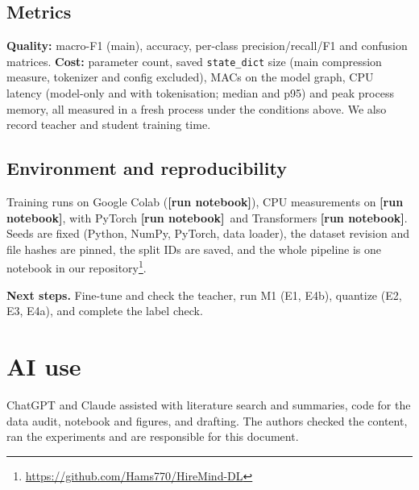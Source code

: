 \documentclass[11pt]{article}
\newcommand{\RUN}{\textbf{[run notebook]}}
\newcommand{\EnvGPU}{\RUN}\newcommand{\EnvCPU}{\RUN}\newcommand{\EnvTorch}{\RUN}\newcommand{\EnvTransformers}{\RUN}
\begin{document}
\subsection{Metrics}
\textbf{Quality:} macro-F1 (main), accuracy, per-class precision/recall/F1 and confusion matrices. \textbf{Cost:} parameter count, saved \texttt{state\_dict} size (main compression measure, tokenizer and config excluded), MACs on the model graph, CPU latency (model-only and with tokenisation; median and p95) and peak process memory, all measured in a fresh process under the conditions above. We also record teacher and student training time.

\subsection{Environment and reproducibility}
Training runs on Google Colab (\EnvGPU), CPU measurements on \EnvCPU, with PyTorch \EnvTorch\ and Transformers \EnvTransformers. Seeds are fixed (Python, NumPy, PyTorch, data loader), the dataset revision and file hashes are pinned, the split IDs are saved, and the whole pipeline is one notebook in our repository\footnote{\url{https://github.com/Hams770/HireMind-DL}}.

\textbf{Next steps.} Fine-tune and check the teacher, run M1 (E1, E4b), quantize (E2, E3, E4a), and complete the label check.

\section*{AI use}
ChatGPT and Claude assisted with literature search and summaries, code for the data audit, notebook and figures, and drafting. The authors checked the content, ran the experiments and are responsible for this document.
\end{document}
